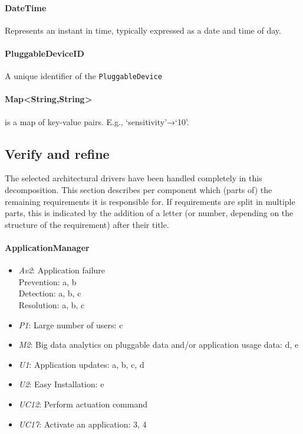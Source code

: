     \paragraph{DateTime}
               Represents an instant in time, typically expressed as a date and time of day.
    \paragraph{PluggableDeviceID}
               A unique identifier of the \texttt{PluggableDevice}
    \paragraph{Map<String,String>}
               is a map of key-value pairs.  E.g., ‘sensitivity’→‘10’.


\subsection{Verify and refine}
    The selected architectural drivers have been handled completely
    in this decomposition.
    This section describes per component which (parts of) the remaining
    requirements it is responsible for. If requirements are split in
    multiple parts, this is indicated by the addition of a letter
    (or number, depending on the structure of the requirement) after their title.

    \paragraph{ApplicationManager}
        \begin{itemize}
            \item \emph{Av2}: Application failure \\
                   Prevention: a, b \\
                   Detection: a, b, c \\
                   Resolution: a, b, c
           \item \emph{P1}: Large number of users: c
           \item \emph{M2}: Big data analytics on pluggable data and/or application usage data: d, e
           \item \emph{U1}: Application updates: a, b, c, d
           \item \emph{U2}: Easy Installation: e
           \item \emph{UC12}: Perform actuation command
           \item \emph{UC17}: Activate an application: 3, 4
        \end{itemize}

